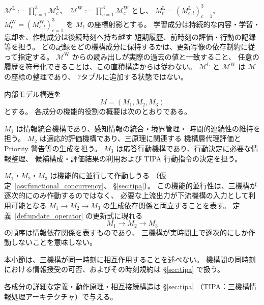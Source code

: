 \begin{definition}[内部モデル状態の学習成分と作動成分]
\label{def:model_learning_working}
$\mathcal M^{\mathrm L}:=\prod_{c=1}^3\mathcal M_c^{\mathrm L}$、
$\mathcal M^{\mathrm W}:=\prod_{c=1}^3\mathcal M_c^{\mathrm W}$ とし、
$M_t^{\mathrm L}=(M_{c,t}^{\mathrm L})_{c=1}^3$、$M_t^{\mathrm W}=(M_{c,t}^{\mathrm W})_{c=1}^3$ を
$M_t$ の座標射影とする。
学習成分は持続的な内容・学習・忘却を、作動成分は後続時刻へ持ち越す
短期履歴、前時刻の評価・行動の記録等を担う。
どの記録をどの機構成分に保持するかは、更新写像の依存制約に従って指定する。
$\mathcal M^{\mathrm W}$ からの読み出しが実際の過去の値と一致すること、
任意の履歴を符号化できることは、この直積構造からは従わない。
$\mathcal M^{\mathrm L}$ と $\mathcal M^{\mathrm W}$ は $\mathcal M$ の座標の整理であり、
7タプルに追加する状態ではない。
\end{definition}


\begin{definition}[内部モデル構造]
\label{def:internal_model}

内部モデル構造を
\[
  M=(M_1,M_2,M_3)
\]
とする。
各成分の機能的役割の概要は次のとおりである。

$M_1$ は情報統合機構であり、感知情報の統合・境界管理・
時間的連続性の維持を担う。
$M_2$ は適応的評価機構であり、三原理に関連する
機構層代理評価と Priority 警告等の生成を担う。
$M_3$ は応答行動機構であり、行動決定に必要な情報整理、
候補構成・評価結果の利用および TIPA 行動指令の決定を担う。

$M_1$・$M_2$・$M_3$ は機能的に並行して作動しうる
（仮定~\ref{ass:functional_concurrency}、
\S\ref{sec:tipa}）。
この機能的並行性は、三機構が逐次的にのみ作動するのではなく、
必要な上流出力が下流機構の入力として利用可能となる
$M_1\to M_2\to M_3$ の生成依存関係と両立することを表す。
定義~\ref{def:update_operator} の更新式に現れる
\[
  M_1\to M_2\to M_3
\]
の順序は情報依存関係を表すものであり、
三機構が実時間上で逐次的にしか作動しないことを意味しない。

本小節は、三機構が同一時刻に相互作用することを述べない。
機構間の同時刻における情報授受の可否、およびその時刻規約は
\S\ref{sec:tipa} で扱う。

各成分の詳細な定義・動作原理・相互接続構造は
\S\ref{sec:tipa}
（TIPA：三機構情報処理アーキテクチャ）で与える。
\end{definition}

